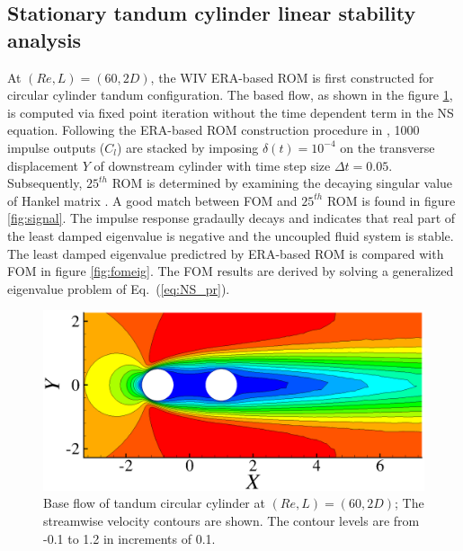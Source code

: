 \subsection{Stationary tandum cylinder linear stability analysis}\label{sec:lsa}

At $(Re,L)=(60,2D)$, the WIV ERA-based ROM is first constructed for circular cylinder 
tandum configuration. The based flow, as shown in the figure \ref{fig:baseflow}, is computed via fixed point iteration without the 
time dependent term in the NS equation. 
Following the ERA-based ROM construction procedure in \cite{yao_jfm_1}, 
1000 impulse outputs ($C_l$) are stacked by imposing $\delta (t) = 10^{-4}$
on the transverse displacement $Y$ of downstream cylinder with time step size $\Delta t = 0.05$.
Subsequently, $25^{th}$ ROM is determined by examining the decaying singular value of Hankel matrix \cite{Juang1985}. 
A good match between FOM and $25^{th}$ ROM is found in figure \ref{fig:signal}. The impulse response gradaully decays 
and indicates that real part of the least damped eigenvalue is negative and the uncoupled fluid system is stable. 
%
The least damped eigenvalue predictred by ERA-based ROM is compared with FOM in figure \ref{fig:fomeig}. The FOM results 
are derived by solving a generalized eigenvalue problem of Eq.~(\ref{eq:NS_pr}). 


\begin{figure}
	 \centering
	 \includegraphics[scale=0.5]{baseflow_re60_ld2}
     \caption{Base flow of tandum circular cylinder at $(Re,L)=(60,2D)$; The 
     streamwise velocity contours are shown. The contour levels are from -0.1 to 1.2 
     in increments of 0.1.}
\label{fig:baseflow}
\end{figure}


